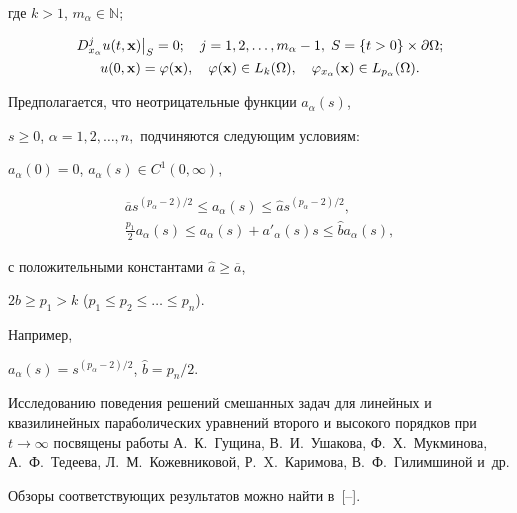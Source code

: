 где $k>1$, $m_\alpha\in \mathbb{N}$;

\begin{gather}

\label{eq:kojleont:gu} D^{j}_{x_\alpha}u(t,{\bf x})\big|_{S}=

0;\quad j= 1, 2, \dots, m_\alpha-1, \; S=\{t>0\}\times\partial \Omega;\\

\label{eq:kojleont:gu} u(0,{\bf x})=\varphi({\bf x}),\quad

\varphi({\bf x})\in L_k(\Omega),\quad\varphi_{x_{\alpha}}({\bf

x})\in L_{p_{\alpha}}(\Omega).

\end{gather}

Предполагается, что неотрицательные функции $a_{\alpha}(s)$,

$s\geq 0$, $\alpha=1, 2, \dots, n,$  подчиняются следующим условиям:

$a_{\alpha}(0)=0$, $a_{\alpha}(s)\in C^1(0,\infty),$

\begin{gather}

\label{eq:kojleont:us1} \overline{a}s^{(p_{\alpha}-2)/2}\leq

a_{\alpha}(s)\leq\widehat{a} s^{(p_{\alpha}-2)/2},\\

\frac{p_1}{2}a_{\alpha}(s)\leq a_{\alpha}(s)+a'_{\alpha}(s)s\leq

\widehat{b}a_{\alpha}(s),

\end{gather}

с положительными константами $\widehat{a}\geq \overline{a}$,

$2\widehat{b}\geq p_1>k$ ($p_1\leq p_2\leq \ldots\leq p_n$).

Например,

$a_{\alpha}(s)=s^{(p_{\alpha}-2)/2}$, $ \widehat{b}=p_n/2.$



 Исследованию  поведения решений смешанных задач для линейных и квазилинейных параболических уравнений второго и высокого порядков при $t\to \infty$ посвящены работы А.~К.~Гущина, В.~И.~Ушакова, Ф.~Х.~Мукминова,  А.~Ф.~Тедеева, Л.~М.~Кожевниковой, Р.~X.~Каримова, В.~Ф.~Гилимшиной и~др.

Обзоры соответствующих результатов можно найти в~[--].



